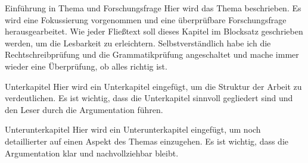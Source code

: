 \begin{section}{Einführung in Thema und Forschungsfrage}
Hier wird das Thema beschrieben. Es wird eine Fokussierung vorgenommen und eine überprüfbare Forschungsfrage herausgearbeitet.
Wie jeder Fließtext soll dieses Kapitel im Blocksatz geschrieben werden, um die Lesbarkeit zu erleichtern.
Selbstverständlich habe ich die Rechtschreibprüfung und die Grammatikprüfung angeschaltet und mache immer wieder eine Überprüfung, ob alles richtig ist.

\begin{subsection}{Unterkapitel}
Hier wird ein Unterkapitel eingefügt, um die Struktur der Arbeit zu verdeutlichen. Es ist wichtig, dass die Unterkapitel sinnvoll gegliedert sind und den Leser durch die Argumentation führen.

\begin{subsubsection}{Unterunterkapitel}
Hier wird ein Unterunterkapitel eingefügt, um noch detaillierter auf einen Aspekt des Themas einzugehen. Es ist wichtig, dass die Argumentation klar und nachvollziehbar bleibt.
\end{subsubsection}

\end{subsection}

\end{section}
